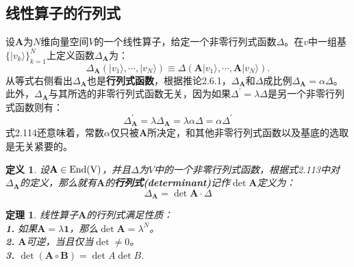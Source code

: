 \documentclass[mathserif,hyperref,UTF8,openany,b5paper]{ctexbook}
\newtheorem{defn}{定义}[section]
\newtheorem{thm}{定理}[section]
\begin{document}
\subsection{线性算子的行列式}
设$\mathbf{A}$为$N$维向量空间$V$的一个线性算子，给定一个非零行列式函数$\Delta$。在$v$中一组基$\{|v_k\rangle\}^N_{k=1}$上定义函数$\Delta_\mathbf{A}$为：
\begin{equation}
    \Delta_\mathbf{A}(|v_1\rangle,\cdots,|v_N\rangle)\equiv\Delta(\mathbf{A}|v_1\rangle,\cdots,\mathbf{A}|v_N\rangle).
\end{equation}
从等式右侧看出$\Delta_\mathbf{A}$也是\textbf{行列式函数}，根据推论2.6.1，$\Delta_\mathbf{A}$和$\Delta$成比例$\Delta_\mathbf{A}=\alpha\Delta$。此外，$\Delta_\mathbf{A}$与其所选的非零行列式函数无关，因为如果$\Delta^{'}=\lambda\Delta$是另一个非零行列式函数则有：
\begin{equation}
    \Delta^{'}_\mathbf{A}=\lambda\Delta_\mathbf{A}=\lambda\alpha\Delta=\alpha\Delta^{'}
\end{equation}
式2.114还意味着，常数$\alpha$仅只被$\mathbf{A}$所决定，和其他非零行列式函数以及基底的选取是无关紧要的。
\begin{defn}
设$\mathbf{A}\in \rm End(V)$，并且$\Delta$为$V$中的一个非零行列式函数，根据式2.113中对$\Delta_\mathbf{A}$的定义，那么就有$\mathbf{A}$的\textbf{行列式(determinant)}记作$\det \mathbf{A}$定义为：
\begin{equation}
    \boxed{\Delta_\mathbf{A}=\det \mathbf{A}\cdot\Delta}
\end{equation}
\end{defn}
\begin{thm}
线性算子$\mathbf{A}$的行列式满足性质：\\
\textbf{1.} 如果$\mathbf{A}=\lambda\mathbf{1}$，那么$\det \mathbf{A}=\lambda^N$。\\
\textbf{2.} $\mathbf{A}$可逆，当且仅当$\det\neq 0$。\\
\textbf{3.} $\det(\mathbf{A}\circ\mathbf{B})=\det A \det B.$ 
\end{thm}
\end{document}
